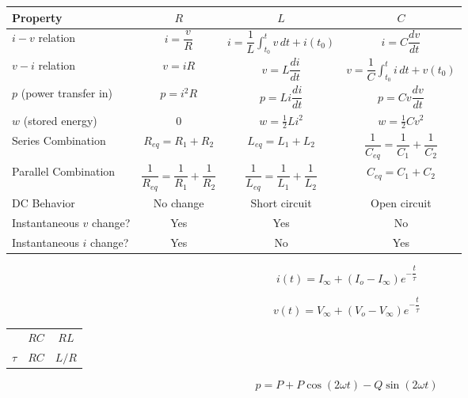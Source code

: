     \renewcommand{\arraystretch}{2.5}
  \begin{center}
    \begin{tabular}[H]{| l c c c |}
      \hline
      Property & $R$ & $L$ & $C$\\
      \hline
      $i-v$ relation & $i=\dfrac{v}{R}$ & $i=\dfrac{1}{L}\displaystyle \int_{t_0}^t v\,dt + i(t_0)$ & $i=C\dfrac{dv}{dt}$\\
      $v-i$ relation & $v=iR$ & $v=L\dfrac{di}{dt}$ & $v=\dfrac{1}{C}\displaystyle \int_{t_0}^t i\,dt+v(t_0)$\\
      $p$ (power transfer in) & $p=i^2R$ & $p=Li\dfrac{di}{dt}$ & $p=Cv\dfrac{dv}{dt}$\\
      $w$ (stored energy) & 0 & $w=\frac{1}{2}Li^2$ & $w=\frac{1}{2}Cv^2$\\
      Series Combination & $R_{eq}=R_1+R_2$ & $L_{eq}=L_1+L_2$ & $\dfrac{1}{C_{eq}}=\dfrac{1}{C_1}+\dfrac{1}{C_2}$\\
      Parallel Combination & $\dfrac{1}{R_{eq}}=\dfrac{1}{R_1}+\dfrac{1}{R_2}$ & $\dfrac{1}{L_{eq}}=\dfrac{1}{L_1}+\dfrac{1}{L_2}$ & $C_{eq}=C_1+C_2$\\
      DC Behavior & No change & Short circuit & Open circuit \\
      Instantaneous $v$ change? & Yes & Yes & No\\
      Instantaneous $i$ change? & Yes & No & Yes\\
      \hline
    \end{tabular}
  \end{center}

  \begin{multicols}{2}

    $$\boxed{i(t)=I_{\infty}+(I_o-I_{\infty})e^{-\dfrac{t}{\tau}}}$$

    $$\boxed{v(t)=V_{\infty}+(V_o-V_{\infty})e^{-\dfrac{t}{\tau}}}$$

  \end{multicols}

  \renewcommand{\arraystretch}{1.5}
  \begin{center}
    \begin{tabular}{| c c c |}
      \hline
      & $RC$ & $RL$ \\
      $\tau$ & $RC$ & $L/R$\\
      \hline
    \end{tabular}
  \end{center}

  $$\boxed{p = P + P\cos(2\omega t) - Q\sin(2\omega t)}$$

